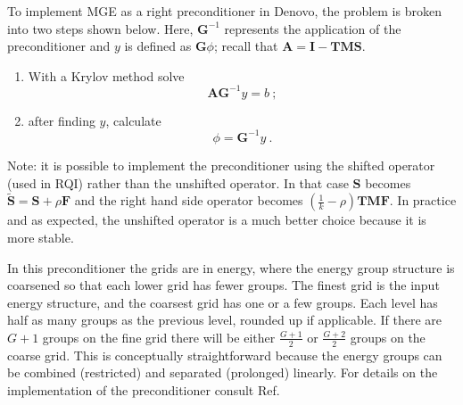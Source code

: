 \documentclass{article}                                                                           %
\newcommand{\ve}[1]{\ensuremath{\mathbf{#1}}}
\begin{document}
To implement MGE as a right preconditioner in Denovo, the problem is broken into two steps shown below. Here, $\ve{G}^{-1}$ represents the application of the preconditioner and $y$ is defined as $\ve{G}\phi$; recall that $\ve{A} = \ve{I} - \ve{TMS}$.  
%
\begin{enumerate}
  \item With a Krylov method solve 
    \begin{equation}
      \ve{AG}^{-1}y = b \:; \label{eq:PrecondKrylov} 
    \end{equation}
  \item after finding $y$, calculate 
    \begin{equation}
      \phi = \ve{G}^{-1}y \:. \label{eq:PrecondPhi}
    \end{equation}
\end{enumerate}

Note: it is possible to implement the preconditioner using the shifted operator (used in RQI) rather than the unshifted operator. In that case $\mathbf{S}$ becomes $\tilde{\ve{S}} = \ve{S} + \rho\ve{F}$ and the right hand side operator becomes $(\frac{1}{k} - \rho)\ve{TMF}$. In practice and as expected, the unshifted operator is a much better choice because it is more stable. 

In this preconditioner the grids are in energy, where the energy group structure is coarsened so that each lower grid has fewer groups. The finest grid is the input energy structure, and the coarsest grid has one or a few groups. Each level has half as many groups as the previous level, rounded up if applicable. If there are $G+1$ groups on the fine grid there will be either $\frac{G+1}{2}$ or $\frac{G+2}{2}$ groups on the coarse grid. This is conceptually straightforward because the energy groups can be combined (restricted) and separated (prolonged) linearly. For details on the implementation of the preconditioner consult Ref. \cite{Slaybaugh2013}
%
\end{document}
